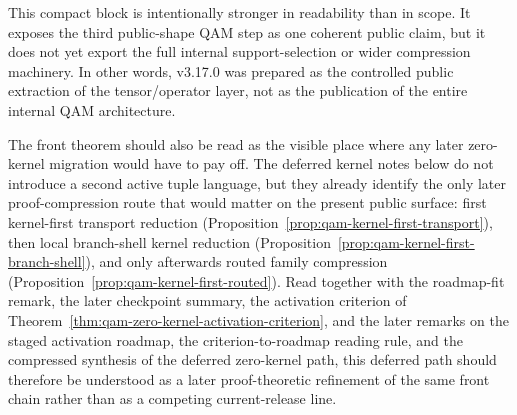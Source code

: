 \begin{remark}
This compact block is intentionally stronger in readability than in scope. It exposes the third public-shape QAM step as one coherent public claim, but it does not yet export the full internal support-selection or wider compression machinery. In other words, v3.17.0 was prepared as the controlled public extraction of the tensor/operator layer, not as the publication of the entire internal QAM architecture.
\end{remark}

\begin{remark}
The front theorem should also be read as the visible place where any later zero-kernel migration would have to pay off. The deferred kernel notes below do not introduce a second active tuple language, but they already identify the only later proof-compression route that would matter on the present public surface: first kernel-first transport reduction (Proposition~\ref{prop:qam-kernel-first-transport}), then local branch-shell kernel reduction (Proposition~\ref{prop:qam-kernel-first-branch-shell}), and only afterwards routed family compression (Proposition~\ref{prop:qam-kernel-first-routed}). Read together with the roadmap-fit remark, the later checkpoint summary, the activation criterion of Theorem~\ref{thm:qam-zero-kernel-activation-criterion}, and the later remarks on the staged activation roadmap, the criterion-to-roadmap reading rule, and the compressed synthesis of the deferred zero-kernel path, this deferred path should therefore be understood as a later proof-theoretic refinement of the same front chain rather than as a competing current-release line.
\end{remark}

